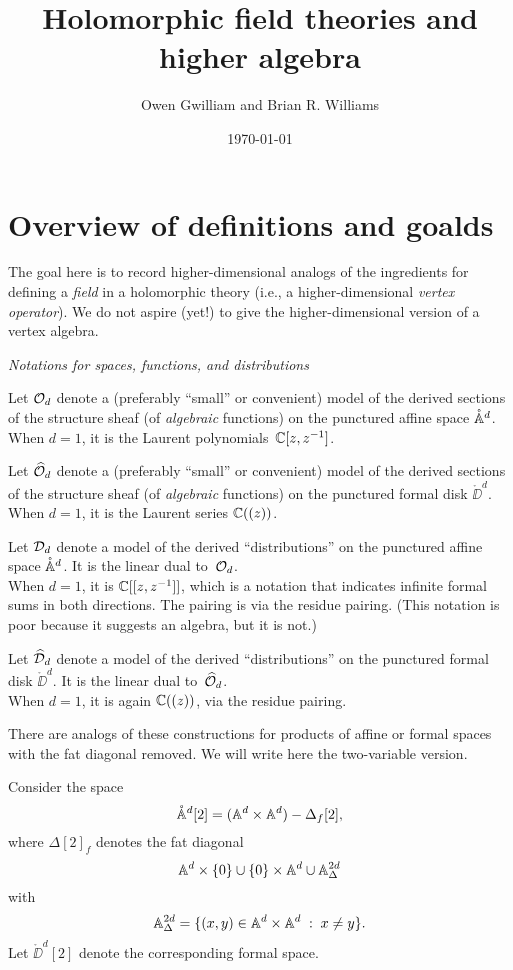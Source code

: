 \documentclass[11pt]{amsart}
\author{Owen Gwilliam and Brian R. Williams}
\date{\today}
\title{Holomorphic field theories and higher algebra}
\begin{document}
\section{Overview of definitions and goalds}

The goal here is to record higher-dimensional analogs of the ingredients for defining a {\em field} in a holomorphic theory (i.e., a higher-dimensional {\em vertex operator}). We do not aspire (yet!) to give the higher-dimensional version of a vertex algebra.

{\it Notations for spaces, functions, and distributions}

Let $\cO_d$ denote a (preferably ``small'' or convenient) model of the derived sections of the structure sheaf (of {\em algebraic} functions) on the punctured affine space $\mathring{\AA}^d$.\\
{\tiny When $d=1$, it is the Laurent polynomials~$\CC[z,z^{-1}]$.}

Let $\widehat{\cO}_d$ denote a (preferably ``small'' or convenient) model of the derived sections of the structure sheaf (of {\em algebraic} functions) on the punctured formal disk $\mathring{\DD}^d$.\\
{\tiny When $d=1$, it is the Laurent series $\CC((z))$.}

Let $\cD_d$ denote a model of the derived ``distributions'' on the punctured affine space $\mathring{\AA}^d$. It is the linear dual to~$\cO_d$.\\
{\tiny When $d=1$, it is $\CC[[z,z^{-1}]]$, which is a notation that indicates infinite formal sums in both directions. The pairing is via the residue pairing. (This notation is poor because it suggests an algebra, but it is not.)}

Let $\widehat{\cD}_d$ denote a model of the derived ``distributions'' on the punctured formal disk $\mathring{\DD}^d$. It is the linear dual to~$\widehat{\cO}_d$.\\
{\tiny When $d=1$, it is again $\CC((z))$, via the residue pairing.}

There are analogs of these constructions for products of affine or formal spaces with the fat diagonal removed.
We will write here the two-variable version.

Consider the space 
\[
\mathring{\AA}^{d}[2]= (\AA^d \times \AA^d) - \Delta_f{[2]}, 
\]
where $\Delta[2]_f$ denotes the fat diagonal
\[
\AA^d \times \{0\} \cup \{0\} \times \AA^d \cup \AA^{2d}_\Delta
\]
with
\[
 \AA^{2d}_\Delta = \{ (x,y) \in \AA^d \times \AA^d \; : \; x \neq y\}.
\]
Let $\mathring{\DD}^d[2]$ denote the corresponding formal space.
\end{document}
